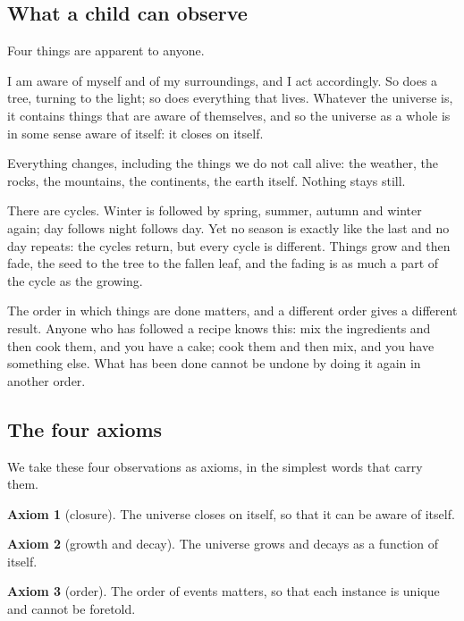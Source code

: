 \documentclass[11pt,a4paper]{article}
\theoremstyle{plain}
\theoremstyle{definition}
\newtheorem{axiom}{Axiom}
\theoremstyle{remark}
\begin{document}
\subsection{What a child can observe}\label{sec:observe}

Four things are apparent to anyone.

I am aware of myself and of my surroundings, and I act accordingly. So does a tree, turning to the light; so does everything that lives. Whatever the universe is, it contains things that are aware of themselves, and so the universe as a whole is in some sense aware of itself: it closes on itself.

Everything changes, including the things we do not call alive: the weather, the rocks, the mountains, the continents, the earth itself. Nothing stays still.

There are cycles. Winter is followed by spring, summer, autumn and winter again; day follows night follows day. Yet no season is exactly like the last and no day repeats: the cycles return, but every cycle is different. Things grow and then fade, the seed to the tree to the fallen leaf, and the fading is as much a part of the cycle as the growing.

The order in which things are done matters, and a different order gives a different result. Anyone who has followed a recipe knows this: mix the ingredients and then cook them, and you have a cake; cook them and then mix, and you have something else. What has been done cannot be undone by doing it again in another order.

\subsection{The four axioms}\label{sec:fouraxioms}

We take these four observations as axioms, in the simplest words that carry them.

\begin{axiom}[closure]\label{ax:A1}
The universe closes on itself, so that it can be aware of itself.
\end{axiom}

\begin{axiom}[growth and decay]\label{ax:A2}
The universe grows and decays as a function of itself.
\end{axiom}

\begin{axiom}[order]\label{ax:A3}
The order of events matters, so that each instance is unique and cannot be foretold.
\end{axiom}
\end{document}
